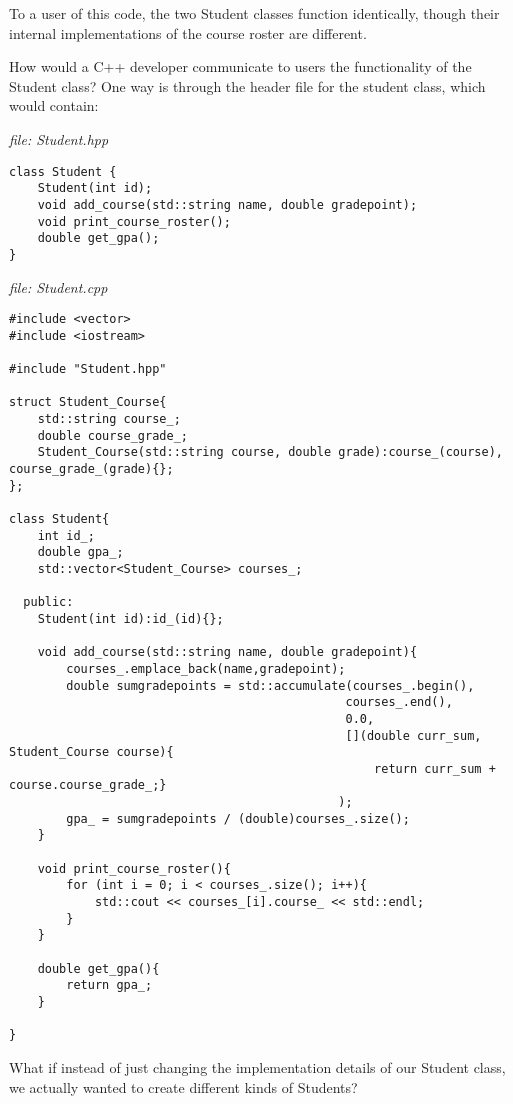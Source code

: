 \documentclass[11pt]{article}
\begin{document}
    To a user of this code, the two Student classes function identically,
though their internal implementations of the course roster are
different.

How would a C++ developer communicate to users the functionality of the
Student class? One way is through the header file for the student class,
which would contain:

    \emph{file: Student.hpp}

\begin{verbatim}
class Student {
    Student(int id);
    void add_course(std::string name, double gradepoint);
    void print_course_roster();
    double get_gpa();
}
\end{verbatim}

    \emph{file: Student.cpp}

\begin{verbatim}
#include <vector>
#include <iostream>

#include "Student.hpp"

struct Student_Course{
    std::string course_;
    double course_grade_;
    Student_Course(std::string course, double grade):course_(course), course_grade_(grade){};
};

class Student{
    int id_;
    double gpa_;
    std::vector<Student_Course> courses_;
  
  public:
    Student(int id):id_(id){};
    
    void add_course(std::string name, double gradepoint){
        courses_.emplace_back(name,gradepoint);
        double sumgradepoints = std::accumulate(courses_.begin(),
                                               courses_.end(),
                                               0.0,
                                               [](double curr_sum, Student_Course course){
                                                   return curr_sum + course.course_grade_;}
                                              );
        gpa_ = sumgradepoints / (double)courses_.size();
    }
    
    void print_course_roster(){
        for (int i = 0; i < courses_.size(); i++){
            std::cout << courses_[i].course_ << std::endl;
        }
    }
    
    double get_gpa(){
        return gpa_;
    }
    
}
\end{verbatim}

    What if instead of just changing the implementation details of our
Student class, we actually wanted to create different kinds of Students?
\end{document}

